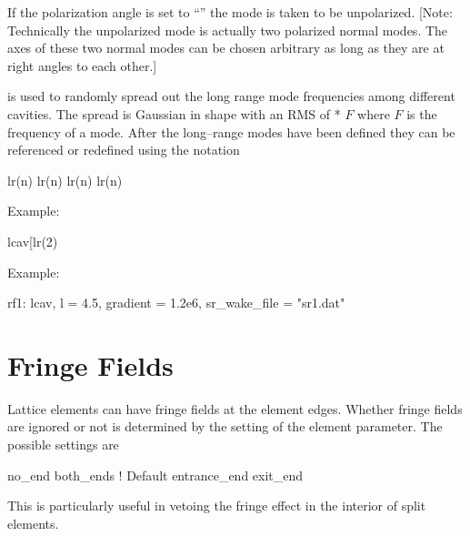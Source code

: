 If the polarization angle is set to ``'' the mode is
taken to be unpolarized. [Note: Technically the unpolarized mode is
actually two polarized normal modes. The axes of these two normal
modes can be chosen arbitrary as long as they are at right angles to
each other.]

 is used to randomly spread out the long range mode
frequencies among different cavities. The spread is Gaussian in shape
with an RMS of  * $F$ where $F$ is the frequency of a
mode.  After the long--range modes have been defined they can be
referenced or redefined using the notation
\begin{example}
  lr(n)%
  lr(n)%
  lr(n)%
  lr(n)%
\end{example}
Example:
\begin{example}
  lcav[lr(2)%
\end{example}

Example:
\begin{example}
  rf1: lcav, l = 4.5, gradient = 1.2e6, sr_wake_file = "sr1.dat"
\end{example}

\section{Fringe Fields}
\label{s:fringe}

Lattice elements can have fringe fields at the element edges. Whether
fringe fields are ignored or not is determined by the setting
of the  element parameter. The possible settings are
\begin{example}
  no_end         
  both_ends             ! Default
  entrance_end
  exit_end
\end{example}
This is particularly useful in vetoing the
fringe effect in the interior of split elements.

